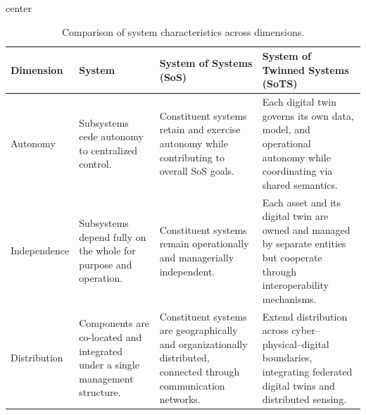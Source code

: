 \begin{table}[htbp]
\centering
\caption{Comparison of system characteristics across \citet{nielsen2015systems} dimensions.}
\label{tab:sys_sos_sots}
\small
\renewcommand{\arraystretch}{1.0}
\setlength{\tabcolsep}{3pt}
\hspace*{-0.1\textwidth}
\begin{adjustbox}{center}
\begin{tabularx}{1.3\textwidth}{>{\raggedright\arraybackslash}p{3cm}
                                 >{\raggedright\arraybackslash}p{4.5cm} %
                                 >{\raggedright\arraybackslash}X
                                 >{\raggedright\arraybackslash}X}
\hline
\textbf{Dimension} & \textbf{System} & \textbf{System of Systems (SoS)} & \textbf{System of Twinned Systems (SoTS)} \\
\hline
Autonomy &
Subsystems cede autonomy to centralized control. \cellcite{\cite{jackson1984towards, boardman2006system}} &
Constituent systems retain and exercise autonomy while contributing to overall SoS goals. \cellcite{\cite{maier1998architecting, boardman2006system, nielsen2015systems, jackson1984towards}} &
Each digital twin governs its own data, model, and operational autonomy while coordinating via shared semantics. \cellcite{\cite{borth2019digital, dietz2020digital}} \\

\hline
Independence &
Subsystems depend fully on the whole for purpose and operation. \cellcite{\cite{jackson1984towards, ackoff1971towards}} &
Constituent systems remain operationally and managerially independent. \cellcite{\cite{maier1998architecting, nielsen2015systems}} &
Each asset and its digital twin are owned and managed by separate entities but cooperate through interoperability mechanisms. \cellcite{\cite{borth2019digital, dietz2020digital}} \\

\hline
Distribution &
Components are co-located and integrated under a single management structure. \cellcite{\cite{ackoff1971towards, boardman2006system}} &
Constituent systems are geographically and organizationally distributed, connected through communication networks. \cellcite{\cite{maier1998architecting, nielsen2015systems, boardman2006system}}  &
Extend distribution across cyber–physical–digital boundaries, integrating federated digital twins and distributed sensing. \cellcite{\cite{michael2022integration, borth2019digital, dietz2020digital}}  \\


\end{tabularx}
\end{adjustbox}
\end{table}
